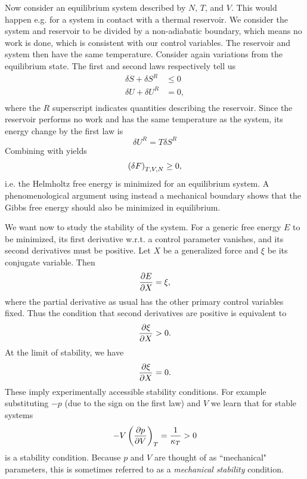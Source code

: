 Now consider an equilibrium system described by $N$, $T$, and $V$. This would
happen e.g. for a system in contact with a thermal reservoir. We consider the
system and reservoir to be divided by a non-adiabatic boundary, which means no
work is done, which is consistent with our control variables. The reservoir and
system then have the same temperature. Consider again variations from the
equilibrium state. The first and second laws respectively tell us
\begin{equation}\begin{aligned}\label{eq:stable1}
\delta S + \delta S^R&\leq 0\\
\delta U + \delta U^R& = 0,\\
\end{aligned}\end{equation}
where the $R$ superscript indicates quantities describing the reservoir.
Since the reservoir performs no work and has the same temperature as the system,
its energy change by the first law is
\begin{equation}\label{eq:Ureservoir}
\delta U^R = T\delta S^R
\end{equation}
Combining  with  yields
\begin{equation}\label{eq:Ureservoir}
\left(\delta F\right)_{T,V,N} \geq 0, 
\end{equation}
i.e. the Helmholtz free energy is minimized for an equilibrium system. A
phenomenological argument using instead a mechanical boundary
shows that the Gibbs free energy should also be minimized in equilibrium.


We want now to study the stability of the system. For a generic free energy $E$
to be minimized, its first derivative w.r.t. a control parameter vanishes, and
its second derivatives must be positive. Let $X$ be a generalized force and
$\xi$ be its conjugate variable. Then 
\begin{equation}
\pdv{E}{X}=\xi,
\end{equation} 
where the partial derivative as usual has the other primary control variables
fixed. Thus the condition that second derivatives are positive is equivalent to
\begin{equation}
\pdv{\xi}{X}>0.
\end{equation} 
At the limit of stability, we have
\begin{equation}\label{eq:stabilityLimit}
\pdv{\xi}{X}=0.
\end{equation}
These imply experimentally accessible stability conditions. For example
substituting $-p$ (due to the sign on the first law) and $V$ we
learn that for stable systems 
\begin{equation}\begin{aligned}\label{eq:kTstable}
-V\left(\pdv{p}{V}\right)_{T}=\frac{1}{\kappa_T}>0
\end{aligned}\end{equation}
is a stability condition. Because $p$ and $V$ are thought of as ``mechanical"
parameters, this is sometimes referred to as a {\it mechanical
stability}
condition.

